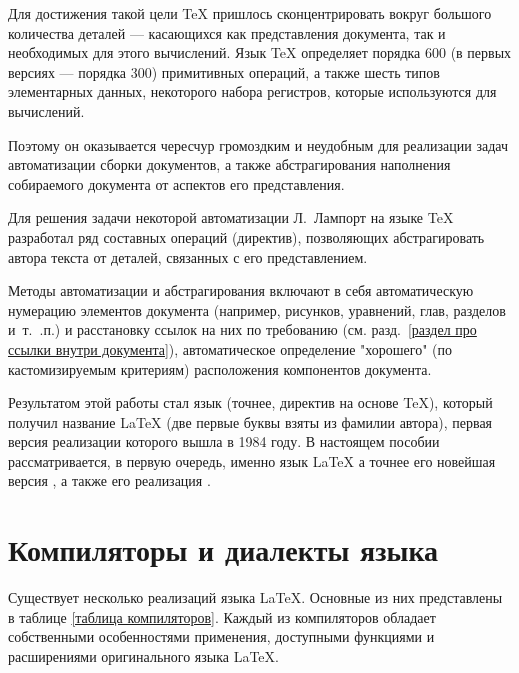 \documentclass[workbook, draught]{fefudoc}
\begin{document}
Для достижения такой цели \TeX{} пришлось сконцентрировать вокруг большого количества деталей --- касающихся как представления документа, так и необходимых для этого вычислений.
Язык \TeX{} определяет порядка 600 (в первых версиях --- порядка 300) примитивных операций, а также шесть типов элементарных данных, некоторого набора регистров, которые используются для вычислений.

Поэтому он оказывается чересчур громоздким и неудобным для реализации задач автоматизации сборки документов, а также абстрагирования наполнения собираемого документа от аспектов его представления.

Для решения задачи некоторой автоматизации Л.~Лампорт на языке \TeX{} разработал ряд составных операций (директив), позволяющих абстрагировать автора текста от деталей, связанных с его представлением.

Методы автоматизации и абстрагирования включают в себя автоматическую нумерацию элементов документа (например, рисунков, уравнений, глав, разделов и~т.~.п.) и расстановку ссылок на них по требованию (см. разд.~\ref{раздел про ссылки внутри документа}), автоматическое определение "хорошего" (по кастомизируемым критериям) расположения компонентов документа.

Результатом этой работы стал язык (точнее, директив на основе \TeX{}), который получил название \LaTeX{} (две первые буквы взяты из фамилии автора), первая версия реализации которого вышла в 1984 году.
В настоящем пособии рассматривается, в первую очередь, именно язык \LaTeX{} а точнее его новейшая версия \LaTeXe{}, а также его реализация \XeLaTeX{}.

\section{Компиляторы и диалекты языка}\label{раздел про компиляторы}
Существует несколько реализаций языка \LaTeX{}.
Основные из них представлены в таблице \ref{таблица компиляторов}.
Каждый из компиляторов обладает собственными особенностями применения, доступными функциями и расширениями оригинального языка \LaTeX{}.
\end{document}
